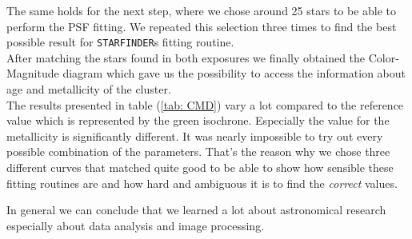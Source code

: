 \begin{description}
	The same holds for the next step, where we chose around 25 stars to be able to perform the PSF fitting. We repeated this selection three times to find the best possible result for \texttt{STARFINDER}s fitting routine. \\
	After matching the stars found in both exposures we finally obtained the Color-Magnitude diagram which gave us the possibility to access the information about age and metallicity of the cluster. \\
	The results presented in table (\ref{tab: CMD}) vary a lot compared to the reference value which is represented by the green isochrone. Especially the value for the metallicity is significantly different. It was nearly impossible to try out every possible combination of the parameters. That's the reason why we chose three different curves that matched quite good to be able to show how sensible these fitting routines are and how hard and ambiguous it is to find the \textit{correct} values.\\ 

\end{description}
In general we can conclude that we learned a lot about astronomical research especially about data analysis and image processing. 